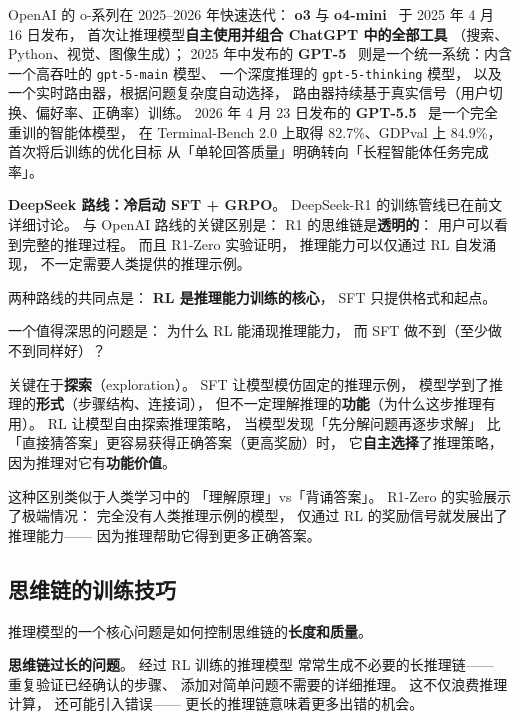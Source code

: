 OpenAI 的 o-系列在 2025--2026 年快速迭代：
\textbf{o3} 与 \textbf{o4-mini}~\cite{openai2025o3o4} 于 2025 年 4 月 16 日发布，
首次让推理模型\textbf{自主使用并组合 ChatGPT 中的全部工具}
（搜索、Python、视觉、图像生成）；
2025 年中发布的 \textbf{GPT-5}~\cite{openai2025gpt5systemcard}
则是一个统一系统：内含一个高吞吐的 \texttt{gpt-5-main} 模型、
一个深度推理的 \texttt{gpt-5-thinking} 模型，
以及一个实时路由器，根据问题复杂度自动选择，
路由器持续基于真实信号（用户切换、偏好率、正确率）训练。
2026 年 4 月 23 日发布的 \textbf{GPT-5.5}~\cite{openai2026gpt55}
是一个完全重训的智能体模型，
在 Terminal-Bench 2.0 上取得 82.7\%、GDPval 上 84.9\%，
首次将后训练的优化目标
从「单轮回答质量」明确转向「长程智能体任务完成率」。

\textbf{DeepSeek 路线：冷启动 SFT + GRPO}。
DeepSeek-R1 的训练管线已在前文详细讨论。
与 OpenAI 路线的关键区别是：
R1 的思维链是\textbf{透明的}：
用户可以看到完整的推理过程。
而且 R1-Zero 实验证明，
推理能力可以仅通过 RL 自发涌现，
不一定需要人类提供的推理示例。

两种路线的共同点是：
\textbf{RL 是推理能力训练的核心}，
SFT 只提供格式和起点。

一个值得深思的问题是：
为什么 RL 能涌现推理能力，
而 SFT 做不到（至少做不到同样好）？

关键在于\textbf{探索}（exploration）。
SFT 让模型模仿固定的推理示例，
模型学到了推理的\textbf{形式}（步骤结构、连接词），
但不一定理解推理的\textbf{功能}（为什么这步推理有用）。
RL 让模型自由探索推理策略，
当模型发现「先分解问题再逐步求解」
比「直接猜答案」更容易获得正确答案（更高奖励）时，
它\textbf{自主选择}了推理策略，
因为推理对它有\textbf{功能价值}。

这种区别类似于人类学习中的
「理解原理」vs「背诵答案」。
R1-Zero 的实验展示了极端情况：
完全没有人类推理示例的模型，
仅通过 RL 的奖励信号就发展出了推理能力——
因为推理帮助它得到更多正确答案。


\subsection{思维链的训练技巧}

推理模型的一个核心问题是如何控制思维链的\textbf{长度和质量}。

\textbf{思维链过长的问题}。
经过 RL 训练的推理模型
常常生成不必要的长推理链——
重复验证已经确认的步骤、
添加对简单问题不需要的详细推理。
这不仅浪费推理计算，
还可能引入错误——
更长的推理链意味着更多出错的机会。

